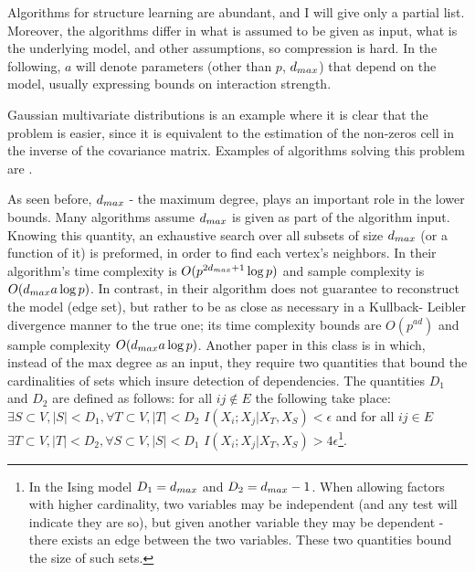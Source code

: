 Algorithms for structure learning are abundant, and I will give only a partial list.
Moreover, the algorithms differ in what is assumed to be given as input, what is the underlying model, and other assumptions, so compression is hard.
In the following, $a$ will denote parameters (other than $p$, $d_{max}$) that depend on the model, usually expressing bounds on interaction strength.

Gaussian multivariate distributions is an example where it is clear that the problem is easier, since it is equivalent to the estimation of the non-zeros cell in the inverse of the covariance matrix. Examples of algorithms solving this problem are \cite{meinshausen2006high, yuan2007model, friedman2008sparse}. 

As seen before, $d_{max}$ - the maximum degree, plays an important role in the lower bounds. Many algorithms \cite{bresler2008reconstruction, abbeel2006learning} assume $d_{max}$ is given as part of the algorithm input. Knowing this quantity, an exhaustive search over all subsets of size $d_{max}$ (or a function of it) is preformed, in order to find each vertex's neighbors.  In\cite{bresler2008reconstruction} their algorithm's time complexity is $O(p^{2d_{max}+1}\log p)$ and sample complexity is $O(d_{max} a \log p)$. In contrast, in \cite{abbeel2006learning} their algorithm does not guarantee to reconstruct the model (edge set), but rather to be as close as necessary in a Kullback- Leibler divergence manner to the true one; its time complexity bounds are $O(p^{a d})$ and sample complexity $O(d_{max} a \log p)$. Another paper in this class is \cite{wu2013learning} in which, instead of the max degree as an input, they require two quantities that bound the cardinalities of sets which insure detection of dependencies. 
The quantities $D_1$ and $D_2$ are defined as follows: for all $ij \not \in E$ the following take place: $\exists S \subset V, |S|< D_1, \forall T \subset V, |T|<D_2$ $I(X_i;X_j | X_T, X_S)<\epsilon$ and for all $ij \in E$ $\exists T \subset V, |T|< D_2, \forall S \subset V, |S|<D_1$ $I(X_i;X_j | X_T, X_S)>4\epsilon$\footnote{In the Ising model $D_1 = d_{max}$ and $D_2 = d_{max} -1$. When allowing factors with higher cardinality, two variables may be independent (and any test will indicate they are so), but given another variable they may be dependent - there exists an edge between the two variables. These two quantities bound the size of such sets.}. 

